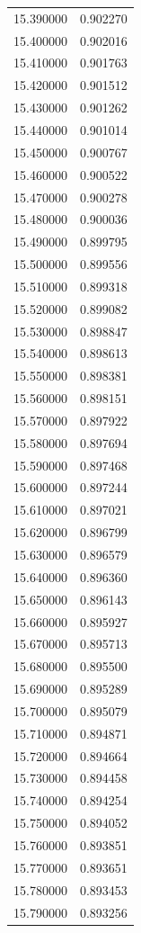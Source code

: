 \begin{tabular}{rr}
15.390000 & 0.902270 \\
15.400000 & 0.902016 \\
15.410000 & 0.901763 \\
15.420000 & 0.901512 \\
15.430000 & 0.901262 \\
15.440000 & 0.901014 \\
15.450000 & 0.900767 \\
15.460000 & 0.900522 \\
15.470000 & 0.900278 \\
15.480000 & 0.900036 \\
15.490000 & 0.899795 \\
15.500000 & 0.899556 \\
15.510000 & 0.899318 \\
15.520000 & 0.899082 \\
15.530000 & 0.898847 \\
15.540000 & 0.898613 \\
15.550000 & 0.898381 \\
15.560000 & 0.898151 \\
15.570000 & 0.897922 \\
15.580000 & 0.897694 \\
15.590000 & 0.897468 \\
15.600000 & 0.897244 \\
15.610000 & 0.897021 \\
15.620000 & 0.896799 \\
15.630000 & 0.896579 \\
15.640000 & 0.896360 \\
15.650000 & 0.896143 \\
15.660000 & 0.895927 \\
15.670000 & 0.895713 \\
15.680000 & 0.895500 \\
15.690000 & 0.895289 \\
15.700000 & 0.895079 \\
15.710000 & 0.894871 \\
15.720000 & 0.894664 \\
15.730000 & 0.894458 \\
15.740000 & 0.894254 \\
15.750000 & 0.894052 \\
15.760000 & 0.893851 \\
15.770000 & 0.893651 \\
15.780000 & 0.893453 \\
15.790000 & 0.893256 \\

\end{tabular}
